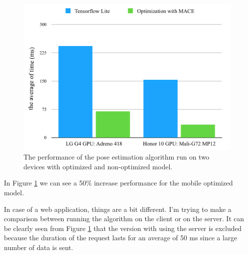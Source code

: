  \begin{figure}[htbp]
	\centerline{\includegraphics[scale=0.7]{fig/mobile-performace.png}}  
	\caption{The performance of the pose estimation algorithm run on two devices with optimized and non-optimized model.}
	\label{fig:mobile-perf}
\end{figure}

In Figure \ref{fig:mobile-perf} we can see a 50\% increase performance for the mobile optimized model.

In case of a web application, things are a bit different. I'm trying to make a comparison between running the algorithm on the client or on the server. It can be clearly seen from Figure \ref{fig:mobile-perf} that the version with using the server is excluded because the duration of the request lasts for an average of 50 ms since a large number of data is sent.

